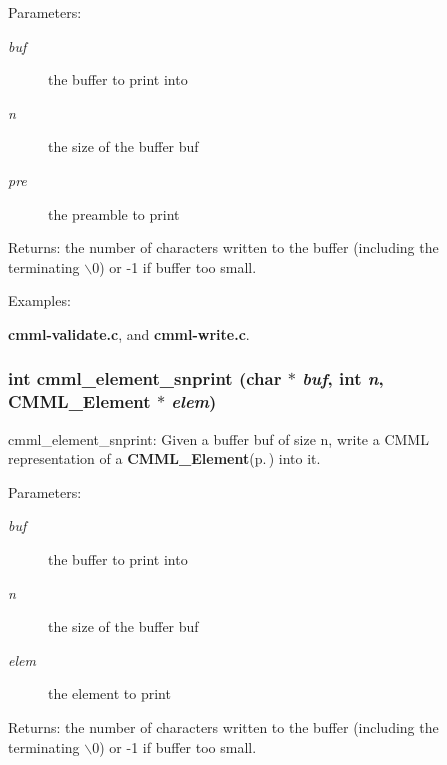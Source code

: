 \begin{Desc}
\item[Parameters:]
\begin{description}
\item[{\em buf}]the buffer to print into \item[{\em n}]the size of the buffer buf \item[{\em pre}]the preamble to print\end{description}
\end{Desc}
\begin{Desc}
\item[Returns:]the number of characters written to the buffer (including the terminating $\backslash$0) or -1 if buffer too small. \end{Desc}
\begin{Desc}
\item[Examples: ]\par
{\bf cmml-validate.c}, and {\bf cmml-write.c}.\end{Desc}
\subsubsection{\setlength{\rightskip}{0pt plus 5cm}int cmml\_\-element\_\-snprint (char $\ast$ {\em buf}, int {\em n}, {\bf CMML\_\-Element} $\ast$ {\em elem})}\label{cmml_8h_a74}


cmml\_\-element\_\-snprint: Given a buffer buf of size n, write a CMML representation of a {\bf CMML\_\-Element}{\rm (p.\,\pageref{structCMML__Element})} into it.

\begin{Desc}
\item[Parameters:]
\begin{description}
\item[{\em buf}]the buffer to print into \item[{\em n}]the size of the buffer buf \item[{\em elem}]the element to print\end{description}
\end{Desc}
\begin{Desc}
\item[Returns:]the number of characters written to the buffer (including the terminating $\backslash$0) or -1 if buffer too small. \end{Desc}
